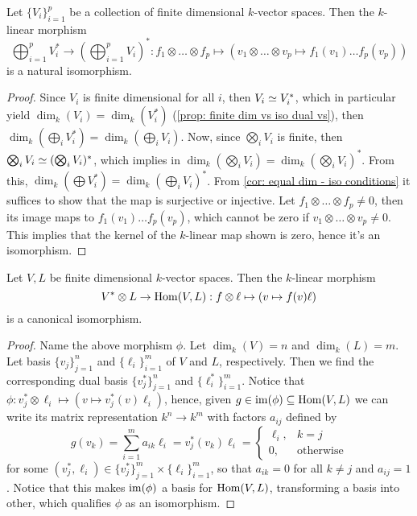 \begin{proposition}\label{prop: dual tensor isomorphism}
  Let \(\{V_i\}_{i=1}^p\) be a collection of finite dimensional \(k\)-vector
  spaces. Then the \(k\)-linear morphism
  \[
    \bigoplus_{i=1}^p V_i^* \to \left( \bigoplus_{i=1}^p V_i \right)^* :
    f_1 \otimes \dots \otimes f_p \mapsto (v_1 \otimes \dots \otimes v_p \mapsto
    f_1(v_1) \dots f_p(v_p))
  \]
  is a natural isomorphism.
\end{proposition}

\begin{proof}
  Since \(V_i\) is finite dimensional for all \(i\), then \(V_i \simeq V_i^*\),
  which in particular yield \(\dim_k(V_i) = \dim_k(V_i^*)\) (\cref{prop: finite
  dim vs iso dual vs}), then \(\dim_k(\bigoplus_i V_i^*) = \dim_k(\bigoplus_i
  V_i)\). Now, since \(\bigotimes_i V_i\) is finite, then \(\bigotimes_i V_i
  \simeq (\bigotimes_i V_i)^*\), which implies in \(\dim_k(\bigotimes_i V_i) =
  \dim_k(\bigotimes_i V_i)^*\). From this, \(\dim_k(\bigoplus V_i^*) =
  \dim_k(\bigoplus_i V_i)^*\). From \cref{cor: equal dim - iso conditions} it
  suffices to show that the map is surjective or injective. Let \(f_1 \otimes
  \dots \otimes f_p \neq 0\), then its image maps to \(f_1(v_1) \dots
  f_p(v_p)\), which cannot be zero if \(v_1 \otimes \dots \otimes v_p \neq 0\).
  This implies that the kernel of the \(k\)-linear map shown is zero, hence it's
  an isomorphism.
\end{proof}

\begin{proposition}\label{prop: tensor with dual iso hom}
  Let \(V, L\) be finite dimensional \(k\)-vector spaces. Then the \(k\)-linear
  morphism
  \[
    V^* \otimes L \to \operatorname{Hom}(V, L) : f \otimes \ell \mapsto (v \mapsto f(v)\ell)
  \]
  is a canonical isomorphism.
\end{proposition}

\begin{proof}
  Name the above morphism \(\phi\). Let \(\dim_k(V) = n\) and \(\dim_k(L) = m\).
  Let basis \(\{v_j\}_{j=1}^n\) and \(\{\ell_i\}_{i=1}^m\) of \(V\) and \(L\),
  respectively. Then we find the corresponding dual basis \(\{v_j^*\}_{j=1}^n\)
  and \(\{\ell_i^*\}_{i=1}^m\). Notice that \(\phi :v_j^* \otimes \ell_i \mapsto
  (v \mapsto v_j^*(v) \ell_i)\), hence, given \(g \in \operatorname{im}(\phi) \subseteq
  \operatorname{Hom}(V, L)\) we can write its matrix representation \(k^n \to k^m\) with
  factors \(a_{ij}\) defined by
  \[
    g(v_k) = \sum_{i=1}^m a_{ik} \ell_i = v_j^*(v_k)\ell_i =
    \begin{cases}
      \ell_i, &k = j\\
      0, &\text{otherwise}
    \end{cases}
  \]
  for some \((v_j^*, \ell_i) \in \{v_j^*\}_{j=1}^m \times \{\ell_i\}_{i=1}^m\),
  so that \(a_{ik} = 0\) for all \(k \neq j\) and \(a_{ij} = 1\). Notice that
  this makes \(\operatorname{im}(\phi)\) a basis for \(\operatorname{Hom}(V, L)\), transforming a basis into
  other, which qualifies \(\phi\) as an isomorphism.
\end{proof}

